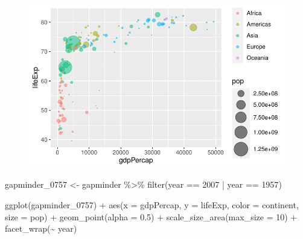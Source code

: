 \documentclass[
  letterpaper,
  DIV=11,
  numbers=noendperiod]{scrartcl}
\newenvironment{Shaded}{\begin{snugshade}}{\end{snugshade}}
\newcommand{\AttributeTok}[1]{\textcolor[rgb]{0.40,0.45,0.13}{#1}}
\newcommand{\DecValTok}[1]{\textcolor[rgb]{0.68,0.00,0.00}{#1}}
\newcommand{\FloatTok}[1]{\textcolor[rgb]{0.68,0.00,0.00}{#1}}
\newcommand{\FunctionTok}[1]{\textcolor[rgb]{0.28,0.35,0.67}{#1}}
\newcommand{\NormalTok}[1]{\textcolor[rgb]{0.00,0.23,0.31}{#1}}
\newcommand{\OtherTok}[1]{\textcolor[rgb]{0.00,0.23,0.31}{#1}}
\newcommand{\SpecialCharTok}[1]{\textcolor[rgb]{0.37,0.37,0.37}{#1}}
\begin{document}
\begin{figure}[H]

{\centering \includegraphics{class05_files/figure-pdf/unnamed-chunk-4-1.pdf}

}

\end{figure}

\begin{Shaded}
\begin{Highlighting}[]
\NormalTok{gapminder\_0757 }\OtherTok{\textless{}{-}}\NormalTok{ gapminder }\SpecialCharTok{\%\textgreater{}\%} \FunctionTok{filter}\NormalTok{(year }\SpecialCharTok{==} \DecValTok{2007} \SpecialCharTok{|}\NormalTok{ year }\SpecialCharTok{==} \DecValTok{1957}\NormalTok{)}

\FunctionTok{ggplot}\NormalTok{(gapminder\_0757) }\SpecialCharTok{+}
  \FunctionTok{aes}\NormalTok{(}\AttributeTok{x =}\NormalTok{ gdpPercap, }\AttributeTok{y =}\NormalTok{ lifeExp, }\AttributeTok{color =}\NormalTok{ continent, }\AttributeTok{size =}\NormalTok{ pop) }\SpecialCharTok{+}
  \FunctionTok{geom\_point}\NormalTok{(}\AttributeTok{alpha =} \FloatTok{0.5}\NormalTok{) }\SpecialCharTok{+}
  \FunctionTok{scale\_size\_area}\NormalTok{(}\AttributeTok{max\_size =} \DecValTok{10}\NormalTok{) }\SpecialCharTok{+}
  \FunctionTok{facet\_wrap}\NormalTok{(}\SpecialCharTok{\textasciitilde{}}\NormalTok{ year)}
\end{Highlighting}
\end{Shaded}
\end{document}
